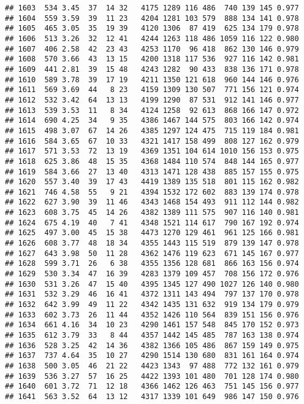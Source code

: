 \documentclass[]{article}
\begin{document}
\begin{verbatim}
## 1603  534 3.45  37  14 32   4175 1289 116 486  740 139 145 0.977
## 1604  559 3.59  39  11 23   4204 1281 103 579  888 134 141 0.978
## 1605  465 3.05  35  19 39   4120 1306  87 419  625 134 179 0.978
## 1606  513 3.26  32  12 41   4244 1263 118 486 1059 116 122 0.980
## 1607  406 2.58  42  23 43   4253 1170  96 418  862 130 146 0.979
## 1608  570 3.66  43  13 15   4200 1318 117 536  927 116 142 0.981
## 1609  441 2.81  39  15 48   4243 1282  90 433  838 136 171 0.978
## 1610  589 3.78  39  17 19   4211 1350 121 618  960 144 146 0.976
## 1611  569 3.69  44   8 23   4159 1309 130 507  771 156 121 0.974
## 1612  532 3.42  64  13 13   4199 1290  87 531  912 141 146 0.977
## 1613  539 3.53  11   8 34   4124 1258  92 613  868 166 147 0.972
## 1614  690 4.25  34   9 35   4386 1467 144 575  803 166 142 0.974
## 1615  498 3.07  67  14 26   4385 1297 124 475  715 119 184 0.981
## 1616  584 3.65  67  10 33   4321 1417 158 499  808 127 162 0.979
## 1617  571 3.53  72  13 19   4369 1351 104 614 1010 156 153 0.975
## 1618  625 3.86  48  15 35   4368 1484 110 574  848 144 165 0.977
## 1619  584 3.66  27  13 40   4313 1471 128 438  885 157 155 0.975
## 1620  557 3.40  39  17 43   4419 1389 135 518  801 115 162 0.982
## 1621  746 4.58  55   9 21   4394 1532 172 602  883 139 174 0.978
## 1622  627 3.90  39  11 46   4343 1468 154 493  911 112 144 0.982
## 1623  608 3.75  45  14 26   4382 1389 111 575  907 116 140 0.981
## 1624  675 4.19  40   7 41   4348 1521 114 617  790 167 192 0.974
## 1625  497 3.00  45  15 38   4473 1270 129 461  961 125 166 0.981
## 1626  608 3.77  48  18 34   4355 1443 115 519  879 139 147 0.978
## 1627  643 3.98  50  11 28   4362 1476 119 623  671 145 167 0.977
## 1628  599 3.71  26   6 38   4355 1356 128 681  866 163 156 0.974
## 1629  530 3.34  47  16 39   4283 1379 109 457  708 156 172 0.976
## 1630  531 3.26  47  15 40   4395 1345 127 490 1027 126 140 0.980
## 1631  532 3.29  46  16 41   4372 1311 143 494  797 137 170 0.978
## 1632  642 3.99  49  11 22   4342 1435 131 632  919 134 179 0.979
## 1633  602 3.73  26  11 44   4352 1426 110 564  839 151 156 0.976
## 1634  661 4.16  34  10 23   4290 1461 157 548  845 170 152 0.973
## 1635  612 3.79  33   8 44   4357 1442 145 485  787 163 138 0.974
## 1636  528 3.25  42  14 36   4382 1366 105 486  867 159 149 0.975
## 1637  737 4.64  35  10 27   4290 1514 130 680  831 161 164 0.974
## 1638  500 3.05  46  21 22   4423 1343  97 488  772 132 161 0.979
## 1639  536 3.27  57  16 25   4422 1393 101 480  701 128 174 0.980
## 1640  601 3.72  71  12 18   4366 1462 126 463  751 145 156 0.977
## 1641  563 3.52  64  13 12   4317 1339 101 649  986 147 150 0.976

\end{verbatim}
\end{document}
